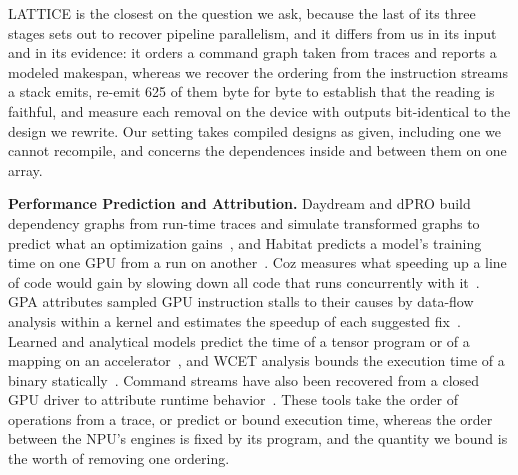 LATTICE is the closest on the question we ask, because the last of its three stages sets out to recover pipeline parallelism, and it differs from us in its input and in its evidence: it orders a command graph taken from traces and reports a modeled makespan, whereas we recover the ordering from the instruction streams a stack emits, re-emit 625 of them byte for byte to establish that the reading is faithful, and measure each removal on the device with outputs bit-identical to the design we rewrite. Our setting takes compiled designs as given, including one we cannot recompile, and concerns the dependences inside and between them on one array.

\textbf{Performance Prediction and Attribution.}
Daydream and dPRO build dependency graphs from run-time traces and simulate transformed graphs to predict what an optimization gains~\citep{zhu2020daydream,hu2022dpro}, and Habitat predicts a model's training time on one GPU from a run on another~\citep{yu2021habitat}.
Coz measures what speeding up a line of code would gain by slowing down all code that runs concurrently with it~\citep{curtsinger2015coz}.
GPA attributes sampled GPU instruction stalls to their causes by data-flow analysis within a kernel and estimates the speedup of each suggested fix~\citep{zhou2021gpa}.
Learned and analytical models predict the time of a tensor program or of a mapping on an accelerator~\citep{kaufman2021learned,parashar2019timeloop,kwon2019maestro}, and WCET analysis bounds the execution time of a binary statically~\citep{wilhelm2008wcet}.
Command streams have also been recovered from a closed GPU driver to attribute runtime behavior~\citep{yan2026revealing}.
These tools take the order of operations from a trace, or predict or bound execution time, whereas the order between the NPU's engines is fixed by its program, and the quantity we bound is the worth of removing one ordering.

